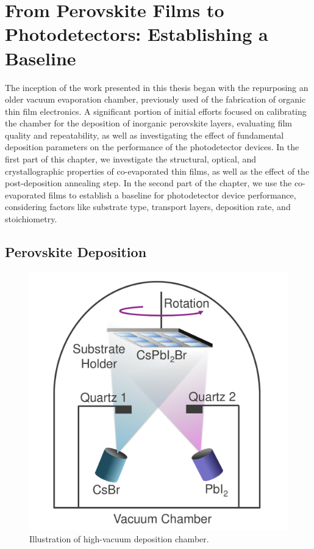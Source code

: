 \chapter{From Perovskite Films to Photodetectors: Establishing a Baseline}\label{ch:material_properties}

The inception of the work presented in this thesis began with the repurposing an older vacuum evaporation chamber, previously used of the fabrication of organic thin film electronics. A significant portion of initial efforts focused on calibrating the chamber for the deposition of inorganic perovskite layers, evaluating film quality and repeatability, as well as investigating the effect of fundamental deposition parameters on the performance of the photodetector devices. In the first part of this chapter, we investigate the structural, optical, and crystallographic properties of co-evaporated  thin films, as well as the effect of the post-deposition annealing step. In the second part of the chapter, we use the co-evaporated films to establish a baseline for photodetector device performance, considering factors like substrate type, transport layers, deposition rate, and stoichiometry. 

\section{Perovskite Deposition}

\begin{figure}
  \centering
  \medskip
  \includegraphics[width=.5\textwidth]{chapters/material_properties/images/Chamber.pdf}
  \caption[Short caption for Table of Figures]{Illustration of high-vacuum deposition chamber.}
  \label{fig:deposition_chamber}
\end{figure}




